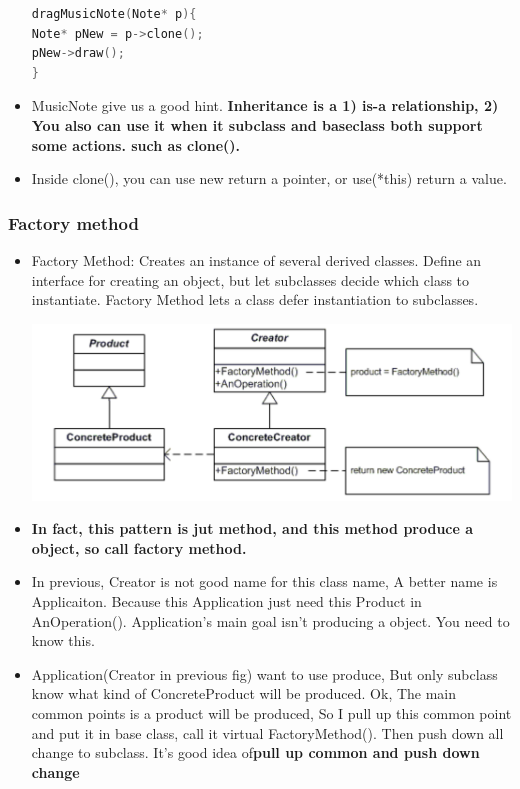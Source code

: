 \documentclass[a4paper,12pt,twoside]{book}
\begin{document}
\begin{itemize}
\begin{lstlisting}[frame=single, language=c++]
dragMusicNote(Note* p){
Note* pNew = p->clone();
pNew->draw();
}
\end{lstlisting}

\item MusicNote give us a good hint. \textbf{Inheritance is a 1) is-a relationship, 2) You also can use it when it subclass and baseclass both support some actions. such as clone(). } 

\item Inside clone(), you can use new return a pointer, or use(*this) return a value.  

\end{itemize}

\subsubsection{Factory method}
\begin{itemize}
\item Factory Method: Creates an instance of several derived classes. Define an interface for creating an object, but let subclasses decide which class to instantiate. Factory Method lets a class defer instantiation to subclasses.

\includegraphics[scale=0.66]{pics/ft.png}

\item \textbf{In fact, this pattern is jut method, and this method produce a object, so call factory method.}
\item In previous, Creator is not good name for this class name, A better name is Applicaiton. Because this Application just need this Product in AnOperation(). Application's main goal isn't producing a object. You need to know this. 

\item Application(Creator in previous fig) want to use produce, But only subclass know what kind of ConcreteProduct will be produced. Ok, The main common points is a product will be produced, So I pull up this common point and put it in base class, call it virtual FactoryMethod(). Then push down all change to subclass. It's good idea of\textbf{pull up common and push down change}

\end{itemize}
\end{document}
